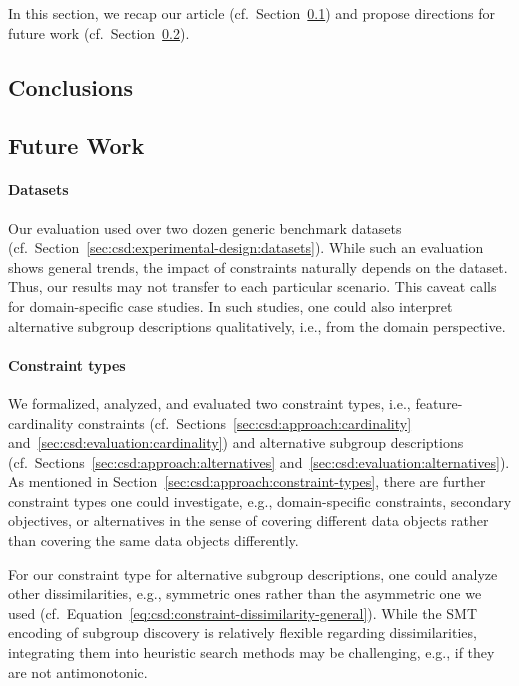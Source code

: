 \documentclass{article}
\theoremstyle{definition}
\begin{document}
In this section, we recap our article (cf.~Section~\ref{sec:csd:conclusion:conclusion}) and propose directions for future work (cf.~Section~\ref{sec:csd:conclusion:future-work}).

\subsection{Conclusions}
\label{sec:csd:conclusion:conclusion}

\subsection{Future Work}
\label{sec:csd:conclusion:future-work}

\paragraph{Datasets}

Our evaluation used over two dozen generic benchmark datasets (cf.~Section~\ref{sec:csd:experimental-design:datasets}).
While such an evaluation shows general trends, the impact of constraints naturally depends on the dataset.
Thus, our results may not transfer to each particular scenario.
This caveat calls for domain-specific case studies.
In such studies, one could also interpret alternative subgroup descriptions qualitatively, i.e., from the domain perspective.

\paragraph{Constraint types}

We formalized, analyzed, and evaluated two constraint types, i.e., feature-cardinality constraints (cf.~Sections~\ref{sec:csd:approach:cardinality} and~\ref{sec:csd:evaluation:cardinality}) and alternative subgroup descriptions (cf.~Sections~\ref{sec:csd:approach:alternatives} and~\ref{sec:csd:evaluation:alternatives}).
As mentioned in Section~\ref{sec:csd:approach:constraint-types}, there are further constraint types one could investigate, e.g., domain-specific constraints, secondary objectives, or alternatives in the sense of covering different data objects rather than covering the same data objects differently.

For our constraint type for alternative subgroup descriptions, one could analyze other dissimilarities, e.g., symmetric ones rather than the asymmetric one we used (cf.~Equation~\ref{eq:csd:constraint-dissimilarity-general}).
While the SMT encoding of subgroup discovery is relatively flexible regarding dissimilarities, integrating them into heuristic search methods may be challenging, e.g., if they are not antimonotonic.
\end{document}

